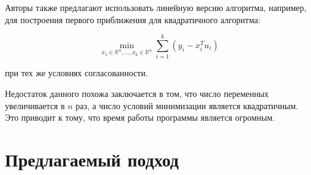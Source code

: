\documentclass[a4paper, 12pt, titlepage]{article}
\theoremstyle{definition}
\theoremstyle{plain}
\theoremstyle{plain}
\begin{document}
Авторы также предлагают использовать линейную версию алгоритма, например, для
построения первого приближения для квадратичного алгоритма:

\begin{equation}
 \min_{x_{1} \in \mathbb{R}^{n}, \ldots, x_{k} \in \mathbb{R}^{n}}
 \sum \limits_{i = 1}^{k} (y_{i} - x_{i}^{T} u_{i})
\end{equation}

при тех же условиях согласованности.

Недостаток данного похожа заключается в том, что число переменных
увеличивается в $n$ раз, а число условий минимизации является квадратичным. Это
приводит к тому, что время работы программы является огромным.





\newpage
\section{Предлагаемый подход}

\newpage


\end{document}
